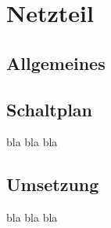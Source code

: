 \chapter{Netzteil}
\label{ch:concept}
\section{Allgemeines}


\section{Schaltplan}
bla bla bla

\section{Umsetzung}
bla bla bla